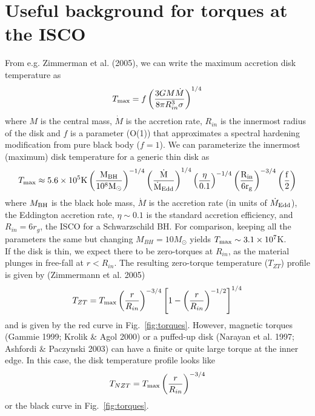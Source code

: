 \documentclass[12pt]{article}
\begin{document}
\section{Useful background for torques at the ISCO}
From e.g. Zimmerman et al. (2005), we can write the maximum accretion disk temperature as
\begin{equation}
T_{\rm max} = f \left(\frac{3 G M \dot{M}}{8 \pi R_{in}^{3} \sigma}\right)^{1/4}
\end{equation}
where $M$ is the central mass, $\dot{M}$ is the accretion rate, $R_{in}$ is the innermost radius of the disk and $f$ is a parameter (O(1)) that approximates a spectral hardening modification from pure black body ($f=1$).  We can parameterize the innermost (maximum) disk temperature for a generic thin disk as
\begin{equation}
T_{\rm max} \approx 5.6 \times 10^{5}\rm{K}\left( \frac{M_{\rm BH}}{10^{8}M_{\odot}}\right)^{-1/4}\left(\frac{\dot{M}}{\dot{M}_{\rm Edd}} \right)^{1/4}\left( \frac{\eta}{0.1}\right)^{-1/4}\left( \frac{R_{in}}{6r_{g}}\right)^{-3/4} \left(\frac{f}{2}\right)
\end{equation}
where $M_{\rm BH}$ is the black hole mass, $\dot{M}$ is the accretion rate (in units of $\dot{M}_{\rm Edd}$), the Eddington accretion rate, $\eta \sim 0.1$ is the standard accretion efficiency, and $R_{in}=6r_{g}$, the ISCO for a Schwarzschild BH. For comparison, keeping all the parameters the same but changing  $M_{BH}=10M_{\odot}$ yields $T_{\rm max} \sim 3.1 \times 10^{7}$K.\\

If the disk is thin, we expect there to be zero-torques at $R_{in}$, as the material plunges in free-fall at $r<R_{in}$. The resulting zero-torque temperature ($T_{ZT}$) profile is given by (Zimmermann et al. 2005)
\begin{equation}
T_{ZT}= T_{\rm max} \left(\frac{r}{R_{in}}\right)^{-3/4}\left[ 1- \left(\frac{r}{R_{in}}\right)^{-1/2}\right]^{1/4} 
\end{equation}
and is given by the red curve in Fig.~\ref{fig:torques}. However, magnetic torques (Gammie 1999; Krolik \& Agol 2000) or a puffed-up disk (Narayan et al. 1997; Ashfordi \& Paczynski 2003) can have a finite or quite large torque at the inner edge. In this case, the disk temperature profile looks like
\begin{equation}
T_{NZT}=T_{\rm max} \left(\frac{r}{R_{in}}\right)^{-3/4}
\end{equation} 
or the black curve in Fig.~\ref{fig:torques}.\\
\end{document}
